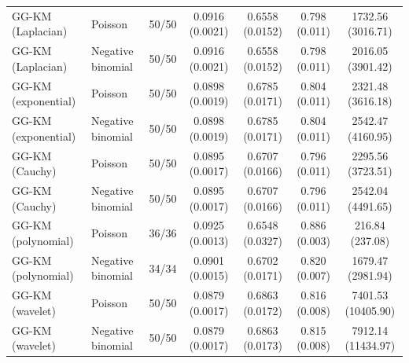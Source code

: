 \begin{table}[tbp]
{\begin{tabular}{llccccc}
GG-KM (Laplacian)
& Poisson
& 50/50
& 0.0916 (0.0021)
& 0.6558 (0.0152)
& 0.798 (0.011)
& 1732.56 (3016.71) \\

GG-KM (Laplacian)
& Negative binomial
& 50/50
& 0.0916 (0.0021)
& 0.6558 (0.0152)
& 0.798 (0.011)
& 2016.05 (3901.42) \\

GG-KM (exponential)
& Poisson
& 50/50
& 0.0898 (0.0019)
& 0.6785 (0.0171)
& 0.804 (0.011)
& 2321.48 (3616.18) \\

GG-KM (exponential)
& Negative binomial
& 50/50
& 0.0898 (0.0019)
& 0.6785 (0.0171)
& 0.804 (0.011)
& 2542.47 (4160.95) \\

GG-KM (Cauchy)
& Poisson
& 50/50
& 0.0895 (0.0017)
& 0.6707 (0.0166)
& 0.796 (0.011)
& 2295.56 (3723.51) \\

GG-KM (Cauchy)
& Negative binomial
& 50/50
& 0.0895 (0.0017)
& 0.6707 (0.0166)
& 0.796 (0.011)
& 2542.04 (4491.65) \\

GG-KM (polynomial)
& Poisson
& 36/36
& 0.0925 (0.0013)
& 0.6548 (0.0327)
& 0.886 (0.003)
& 216.84 (237.08) \\

GG-KM (polynomial)
& Negative binomial
& 34/34
& 0.0901 (0.0015)
& 0.6702 (0.0171)
& 0.820 (0.007)
& 1679.47 (2981.94) \\

GG-KM (wavelet)
& Poisson
& 50/50
& 0.0879 (0.0017)
& 0.6863 (0.0172)
& 0.816 (0.008)
& 7401.53 (10405.90) \\

GG-KM (wavelet)
& Negative binomial
& 50/50
& 0.0879 (0.0017)
& 0.6863 (0.0173)
& 0.815 (0.008)
& 7912.14 (11434.97) \\

\hline
\end{tabular}
}
\end{table}
